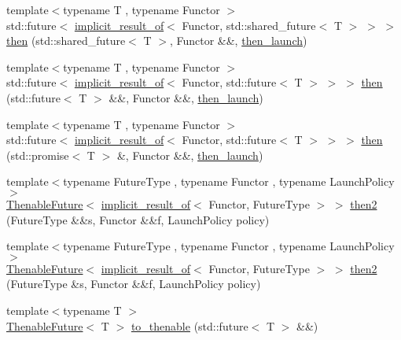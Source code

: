 \begin{DoxyCompactItemize}
{\footnotesize template$<$typename T , typename Functor $>$ }\\std\+::future$<$ \hyperlink{namespacethenable_a1ecf08d6ad8b8688d7b4df047b5feaae}{implicit\+\_\+result\+\_\+of}$<$ Functor, std\+::shared\+\_\+future$<$ T $>$ $>$ $>$ \hyperlink{namespacethenable_a234e54343659f3b576ae0565614d1c64}{then} (std\+::shared\+\_\+future$<$ T $>$, Functor \&\&, \hyperlink{namespacethenable_adf31291b806157ad914943dae5b3c94e}{then\+\_\+launch})
\item 
{\footnotesize template$<$typename T , typename Functor $>$ }\\std\+::future$<$ \hyperlink{namespacethenable_a1ecf08d6ad8b8688d7b4df047b5feaae}{implicit\+\_\+result\+\_\+of}$<$ Functor, std\+::future$<$ T $>$ $>$ $>$ \hyperlink{namespacethenable_aed748177c95e6ae1861c9921bb1c9a84}{then} (std\+::future$<$ T $>$ \&\&, Functor \&\&, \hyperlink{namespacethenable_adf31291b806157ad914943dae5b3c94e}{then\+\_\+launch})
\item 
{\footnotesize template$<$typename T , typename Functor $>$ }\\std\+::future$<$ \hyperlink{namespacethenable_a1ecf08d6ad8b8688d7b4df047b5feaae}{implicit\+\_\+result\+\_\+of}$<$ Functor, std\+::future$<$ T $>$ $>$ $>$ \hyperlink{namespacethenable_aeda63a514e4f56a1be216992fe592ada}{then} (std\+::promise$<$ T $>$ \&, Functor \&\&, \hyperlink{namespacethenable_adf31291b806157ad914943dae5b3c94e}{then\+\_\+launch})
\item 
{\footnotesize template$<$typename Future\+Type , typename Functor , typename Launch\+Policy $>$ }\\\hyperlink{classthenable_1_1_thenable_future}{Thenable\+Future}$<$ \hyperlink{namespacethenable_a1ecf08d6ad8b8688d7b4df047b5feaae}{implicit\+\_\+result\+\_\+of}$<$ Functor, Future\+Type $>$ $>$ \hyperlink{namespacethenable_a80f31095c0a474f5b645c1e00256becf}{then2} (Future\+Type \&\&s, Functor \&\&f, Launch\+Policy policy)
\item 
{\footnotesize template$<$typename Future\+Type , typename Functor , typename Launch\+Policy $>$ }\\\hyperlink{classthenable_1_1_thenable_future}{Thenable\+Future}$<$ \hyperlink{namespacethenable_a1ecf08d6ad8b8688d7b4df047b5feaae}{implicit\+\_\+result\+\_\+of}$<$ Functor, Future\+Type $>$ $>$ \hyperlink{namespacethenable_ac29edcabcae561565e668dfd0fd31217}{then2} (Future\+Type \&s, Functor \&\&f, Launch\+Policy policy)
\item 
{\footnotesize template$<$typename T $>$ }\\\hyperlink{classthenable_1_1_thenable_future}{Thenable\+Future}$<$ T $>$ \hyperlink{namespacethenable_a72a2eff98915486d507c1aba3409e719}{to\+\_\+thenable} (std\+::future$<$ T $>$ \&\&)

\end{DoxyCompactItemize}
